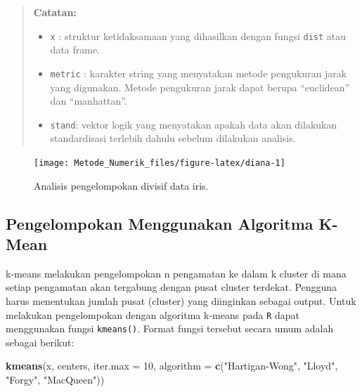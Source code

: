 \documentclass[]{book}
\newenvironment{Shaded}{\begin{snugshade}}{\end{snugshade}}
\newcommand{\DataTypeTok}[1]{\textcolor[rgb]{0.13,0.29,0.53}{#1}}
\newcommand{\DecValTok}[1]{\textcolor[rgb]{0.00,0.00,0.81}{#1}}
\newcommand{\KeywordTok}[1]{\textcolor[rgb]{0.13,0.29,0.53}{\textbf{#1}}}
\newcommand{\NormalTok}[1]{#1}
\newcommand{\StringTok}[1]{\textcolor[rgb]{0.31,0.60,0.02}{#1}}
\providecommand{\tightlist}{%
  \setlength{\itemsep}{0pt}\setlength{\parskip}{0pt}}
\theoremstyle{definition}
\theoremstyle{definition}
\theoremstyle{definition}
\theoremstyle{remark}
\begin{document}
\begin{quote}
\textbf{Catatan:}

\begin{itemize}
\tightlist
\item
  \texttt{x} : struktur ketidaksamaan yang dihasilkan dengan fungsi \texttt{dist} atau data frame.
\item
  \texttt{metric} : karakter string yang menyatakan metode pengukuran jarak yang digunakan. Metode pengukuran jarak dapat berupa ``euclidean'' dan ``manhattan''.
\item
  \texttt{stand}: vektor logik yang menyatakan apakah data akan dilakukan standardisasi terlebih dahulu sebelum dilakukan analisis.
\end{itemize}
\end{quote}

\begin{figure}

{\centering \texttt{[image: Metode\_Numerik\_files/figure-latex/diana-1]} 

}

\caption{Analisis pengelompokan divisif data iris.}\label{fig:diana}
\end{figure}

\hypertarget{pengelompokan-menggunakan-algoritma-k-mean}{%
\subsection{Pengelompokan Menggunakan Algoritma K-Mean}\label{pengelompokan-menggunakan-algoritma-k-mean}}

k-means melakukan pengelompokan n pengamatan ke dalam k cluster di mana setiap pengamatan akan tergabung dengan pusat cluster terdekat. Pengguna harus menentukan jumlah pusat (cluster) yang diinginkan sebagai output. Untuk melakukan pengelompokan dengan algoritma k-means pada \texttt{R} dapat menggunakan fungsi \texttt{kmeans()}. Format fungsi tersebut secara umum adalah sebagai berikut:

\begin{Shaded}
\begin{Highlighting}[]
\KeywordTok{kmeans}\NormalTok{(x, centers, }\DataTypeTok{iter.max =} \DecValTok{10}\NormalTok{,}
       \DataTypeTok{algorithm =} \KeywordTok{c}\NormalTok{(}\StringTok{"Hartigan-Wong"}\NormalTok{, }\StringTok{"Lloyd"}\NormalTok{, }\StringTok{"Forgy"}\NormalTok{,}
                     \StringTok{"MacQueen"}\NormalTok{))}
\end{Highlighting}
\end{Shaded}
\end{document}
